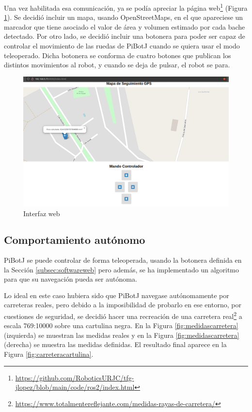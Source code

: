 Una vez habilitada esa comunicación, ya se podía apreciar la página web\footnote{\url{https://github.com/RoboticsURJC/tfg-jlopez/blob/main/code/ros2/index.html}} (Figura \ref{fig:interfazweb}). Se decidió incluir un mapa, usando OpenStreetMaps, en el que apareciese un marcador que tiene asociado el valor de área y volumen estimado por cada bache detectado. Por otro lado, se decidió incluir una botonera para poder ser capaz de controlar el movimiento de las ruedas de PiBotJ cuando se quiera usar el modo teleoperado. Dicha botonera se conforma de cuatro botones que publican los distintos movimientos al robot, y cuando se deja de pulsar, el robot se para.


\begin{figure} [h!]
	\begin{center}
		\includegraphics[width=15cm]{figs/cap6/interfazweb.png}
	\end{center}
	\caption{Interfaz web}
	\label{fig:interfazweb}
\end{figure}


\subsection{Comportamiento autónomo}
\label{subsec:autonomo}
PiBotJ se puede controlar de forma teleoperada, usando la botonera definida en la Sección \ref{subsec:softwareweb} pero además, se ha implementado un algoritmo para que su navegación pueda ser autónoma.

Lo ideal en este caso hubiera sido que PiBotJ navegase autónomamente por carreteras reales, pero debido a la imposibilidad de probarlo en ese entorno, por cuestiones de seguridad, se decidió hacer una recreación de una carretera real\footnote{\url{https://www.totalmentereflejante.com/medidas-rayas-de-carretera/}} a escala 769:10000 sobre una cartulina negra. En la Figura \ref{fig:medidascarretera} (izquierda) se muestran las medidas reales y en la Figura \ref{fig:medidascarretera} (derecha) se muestra las medidas definidas. El resultado final aparece en la Figura \ref{fig:carreteracartulina}.

